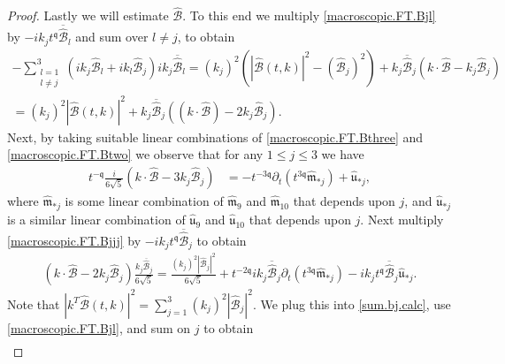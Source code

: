 \documentclass[reqno]{amsart}
\newcommand{\qq}{\mathfrak{q}}
\newcommand{\tq}{t^{\qq}}
\newcommand{\tmq}{t^{-\qq}}
\newcommand{\tTq}{t^{3\qq}}
\newcommand{\tmTq}{t^{-3\qq}}
\theoremstyle{definition}
\numberwithin{equation}{section}
\numberwithin{theorem}{section}
\begin{document}
\begin{proof}
Lastly we will estimate $\widehat{\mathcal{B}}$.  To this end we multiply \eqref{macroscopic.FT.Bjl} by $-ik_j \tq \overline{\widehat{\mathcal{B}}}_l$ and sum over $l\neq j$, to obtain
\begin{multline}
        -\sum_{\substack{l=1 \\ l\neq j}}^3 \left(ik_j \widehat{\mathcal{B}}_l+ik_l \widehat{\mathcal{B}}_j \right)ik_j \overline{\widehat{\mathcal{B}}}_l
    = (k_j)^2 \left(|\widehat{\mathcal{B}}(t,k)|^2 
    -
    ( \widehat{\mathcal{B}}_j )^2\right) 
    + 
     k_j \overline{\widehat{\mathcal{B}}}_j\left( k \cdot \widehat{\mathcal{B}} -k_j \widehat{\mathcal{B}}_j\right)
    \\  \label{sum.bj.calc}
     = (k_j)^2 |\widehat{\mathcal{B}}(t,k)|^2 
    + 
     k_j \overline{\widehat{\mathcal{B}}}_j\left(\left( k \cdot \widehat{\mathcal{B}} \right)
        -
2   k_j   \widehat{\mathcal{B}}_j  \right).
\end{multline}
Next, by taking suitable linear combinations of \eqref{macroscopic.FT.Bthree} and \eqref{macroscopic.FT.Btwo} we observe that for any $1\leq j\leq 3$ we have 
\begin{align}\label{macroscopic.FT.Bjjj}
    \tmq\frac{i}{6\sqrt{5}}\left( k\cdot \widehat{\mathcal{B}}-3k_j \widehat{\mathcal{B}}_j\right)
&=-\tmTq  \partial_t\left( \tTq \widehat{\mathfrak{m}}_{*j} \right)+\widehat{\mathfrak{u}}_{*j},
\end{align}
where $\widehat{\mathfrak{m}}_{*j}$ is some linear combination of  $\widehat{\mathfrak{m}}_{9}$ and $\widehat{\mathfrak{m}}_{10}$ that depends upon $j$, and  $\widehat{\mathfrak{u}}_{*j}$ is a similar linear combination of $\widehat{\mathfrak{u}}_{9}$ and $\widehat{\mathfrak{u}}_{10}$ that depends upon $j$.  Next multiply \eqref{macroscopic.FT.Bjjj} by $-ik_j \tq \overline{\widehat{\mathcal{B}}}_j$ to obtain 
\begin{align*}
    \left( k\cdot \widehat{\mathcal{B}}-2k_j \widehat{\mathcal{B}}_j\right)
    \frac{k_j \overline{\widehat{\mathcal{B}}}_j}{6\sqrt{5}}
= \frac{(k_j)^2 |\widehat{\mathcal{B}}_j|^2}{6\sqrt{5}}
+
t^{-2\qq}  ik_j\overline{\widehat{\mathcal{B}}}_j\partial_t\left( \tTq \widehat{\mathfrak{m}}_{*j} \right)
-
ik_j \tq\overline{\widehat{\mathcal{B}}}_j\widehat{\mathfrak{u}}_{*j}.
\end{align*}
Note that $|k^T\widehat{\mathcal{B}}(t,k)|^2 = \sum_{j=1}^3(k_j)^2 |\widehat{\mathcal{B}}_j|^2$.  
We plug this into \eqref{sum.bj.calc}, use \eqref{macroscopic.FT.Bjl}, and sum on $j$ to obtain 
\begin{multline*}

\end{multline*}
\end{proof}
\end{document}
